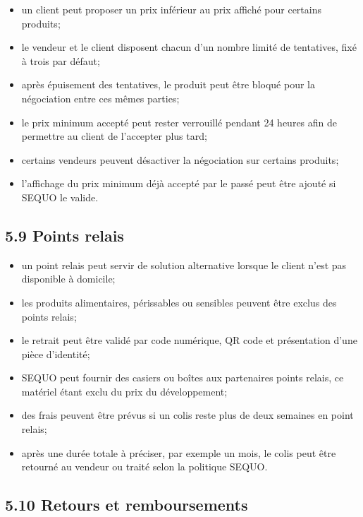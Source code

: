 \documentclass[11pt,a4paper]{article}
\begin{document}
\begin{itemize}
    \item un client peut proposer un prix inférieur au prix affiché pour certains produits;
    \item le vendeur et le client disposent chacun d'un nombre limité de tentatives, fixé à trois par défaut;
    \item après épuisement des tentatives, le produit peut être bloqué pour la négociation entre ces mêmes parties;
    \item le prix minimum accepté peut rester verrouillé pendant 24 heures afin de permettre au client de l'accepter plus tard;
    \item certains vendeurs peuvent désactiver la négociation sur certains produits;
    \item l'affichage du prix minimum déjà accepté par le passé peut être ajouté si SEQUO le valide.
\end{itemize}

\subsection*{5.9 Points relais}

\begin{itemize}
    \item un point relais peut servir de solution alternative lorsque le client n'est pas disponible à domicile;
    \item les produits alimentaires, périssables ou sensibles peuvent être exclus des points relais;
    \item le retrait peut être validé par code numérique, QR code et présentation d'une pièce d'identité;
    \item SEQUO peut fournir des casiers ou boîtes aux partenaires points relais, ce matériel étant exclu du prix du développement;
    \item des frais peuvent être prévus si un colis reste plus de deux semaines en point relais;
    \item après une durée totale à préciser, par exemple un mois, le colis peut être retourné au vendeur ou traité selon la politique SEQUO.
\end{itemize}

\subsection*{5.10 Retours et remboursements}
\end{document}

